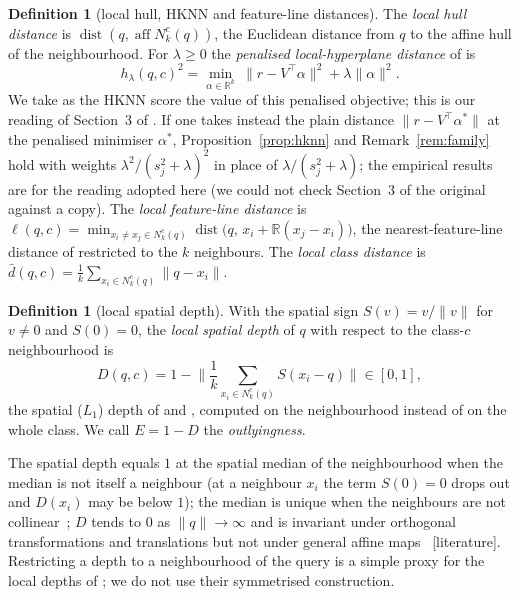 \documentclass[10pt,a4paper]{article}
\theoremstyle{plain}
\theoremstyle{definition}
\newtheorem{definition}[theorem]{Definition}
\theoremstyle{remark}
\newcommand{\R}{\mathbb{R}}
\newcommand{\Nk}{N_k^{c}(q)}
\newcommand{\aff}{\operatorname{aff}}
\newcommand{\dist}{\operatorname{dist}}
\newcommand{\status}[1]{\textsf{\small [#1]}}
\newcommand{\meth}[1]{\textsf{#1}}
\begin{document}
\begin{definition}[local hull, HKNN and feature-line distances]\label{def:hull}
The \emph{local hull distance} is $\dist(q,\aff\Nk)$, the Euclidean distance from $q$ to the affine hull of the neighbourhood. For $\lambda\ge0$ the \emph{penalised local-hyperplane distance} of \citet{vincentbengio2002} is
\[
h_\lambda(q,c)^2=\min_{\alpha\in\R^k}\ \|r-V^{\top}\alpha\|^2+\lambda\|\alpha\|^2 .
\]
We take as the \meth{HKNN} score the value of this penalised objective; this is our reading of Section~3 of \citet{vincentbengio2002}. If one takes instead the plain distance $\|r-V^{\top}\alpha^*\|$ at the penalised minimiser $\alpha^*$, Proposition~\ref{prop:hknn} and Remark~\ref{rem:family} hold with weights $\lambda^2/(s_j^2+\lambda)^2$ in place of $\lambda/(s_j^2+\lambda)$; the empirical results are for the reading adopted here (we could not check Section~3 of the original against a copy). The \emph{local feature-line distance} is $\ell(q,c)=\min_{x_i\ne x_j\in\Nk}\dist\big(q,\,x_i+\R(x_j-x_i)\big)$, the nearest-feature-line distance of \citet{lilu1999} restricted to the $k$ neighbours. The \emph{local class distance} is $\bar d(q,c)=\frac1k\sum_{x_i\in\Nk}\|q-x_i\|$.
\end{definition}

\begin{definition}[local spatial depth]\label{def:depth}
With the spatial sign $S(v)=v/\|v\|$ for $v\ne0$ and $S(0)=0$, the \emph{local spatial depth} of $q$ with respect to the class-$c$ neighbourhood is
\[
D(q,c)=1-\Big\|\frac1k\sum_{x_i\in\Nk}S(x_i-q)\Big\|\in[0,1],
\]
the spatial ($L_1$) depth of \citet{vardizhang2000} and \citet{serfling2002}, computed on the neighbourhood instead of on the whole class. We call $E=1-D$ the \emph{outlyingness}.
\end{definition}

The spatial depth equals $1$ at the spatial median of the neighbourhood when the median is not itself a neighbour (at a neighbour $x_i$ the term $S(0)=0$ drops out and $D(x_i)$ may be below $1$); the median is unique when the neighbours are not collinear~\citep{milasevicducharme1987}; $D$ tends to $0$ as $\|q\|\to\infty$ and is invariant under orthogonal transformations and translations but not under general affine maps~\citep{chaudhuri1996,vardizhang2000,serfling2002} \status{literature}. Restricting a depth to a neighbourhood of the query is a simple proxy for the local depths of \citet{paindaveinevanbever2013}; we do not use their symmetrised construction.
\end{document}

